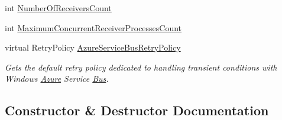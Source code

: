 \begin{DoxyCompactItemize}
\item 
int \hyperlink{classCqrs_1_1Azure_1_1ServiceBus_1_1AzureBus_a65ca2b61bf8f2dba9d0e0f54ec64c2b9_a65ca2b61bf8f2dba9d0e0f54ec64c2b9}{Number\+Of\+Receivers\+Count}
\item 
int \hyperlink{classCqrs_1_1Azure_1_1ServiceBus_1_1AzureBus_a6b517888d91c6a5b026cb5857e75a04f_a6b517888d91c6a5b026cb5857e75a04f}{Maximum\+Concurrent\+Receiver\+Processes\+Count}
\item 
virtual Retry\+Policy \hyperlink{classCqrs_1_1Azure_1_1ServiceBus_1_1AzureBus_a88997183f8e6fa9dcef5b883329e95ce_a88997183f8e6fa9dcef5b883329e95ce}{Azure\+Service\+Bus\+Retry\+Policy}
\begin{DoxyCompactList}\small\item\em Gets the default retry policy dedicated to handling transient conditions with Windows \hyperlink{namespaceCqrs_1_1Azure}{Azure} Service \hyperlink{namespaceCqrs_1_1Bus}{Bus}. \end{DoxyCompactList}\end{DoxyCompactItemize}


\subsection{Constructor \& Destructor Documentation}
\mbox{\label{classCqrs_1_1Azure_1_1ServiceBus_1_1AzureBus_a1046ff74282fd178f43e28420433d2a9_a1046ff74282fd178f43e28420433d2a9}} 
